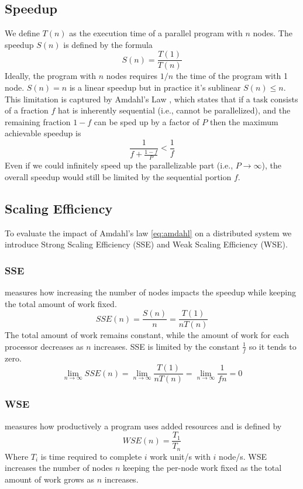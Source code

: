 \documentclass[conference]{IEEEtran}
\begin{document}
\subsection{Speedup}
We define $T(n)$ as the execution time of a parallel program with $n$ nodes. The speedup $S(n)$ is defined by the formula
\begin{equation}
S(n)= \frac{T(1)}{T(n)}
\end{equation}
Ideally, the program with $n$ nodes requires $1/n$ the time of the program with 1 node. $S(n) = n$ is a linear speedup but in practice it's sublinear $S(n) \leq n$. This limitation is captured by Amdahl's Law \cite{10.1145/1465482.1465560}, which states that if a task consists of a fraction $f$ hat is inherently sequential (i.e., cannot be parallelized), and the remaining fraction $1-f$ can be sped up by a factor of $P$ then the maximum achievable speedup is
\begin{equation}
\frac{1}{f + \frac{1-f}{P}}\label{eq:amdahl} < \frac{1}{f}
\end{equation}
Even if we could infinitely speed up the parallelizable part (i.e., $P \rightarrow \infty$), the overall speedup would still be limited by the sequential portion $f$.

\subsection{Scaling Efficiency}
To evaluate the impact of Amdahl's law \eqref{eq:amdahl} on a distributed system we introduce Strong Scaling Efficiency (SSE) and Weak Scaling Efficiency (WSE).

\subsubsection{SSE} measures how increasing the number of nodes impacts the speedup while keeping the total amount of work fixed.
\begin{equation}
    SSE(n) = \frac{S(n)}{n} = \frac{T(1)}{n T(n)}
\end{equation}
The total amount of work remains constant, while the amount of work for each processor decreases as $n$ increases. SSE is limited by the constant $\frac{1}{f}$ so it tends to zero.
\begin{equation}
    \lim_{n\to\infty} SSE(n) = \lim_{n\to\infty} \frac{T(1)}{n T(n)} = \lim_{n\to\infty} \frac{1}{fn} = 0
\end{equation}

\subsubsection{WSE} measures how productively a program uses added resources and is defined by
\begin{equation}
    WSE(n) = \frac{T_1}{T_n}
\end{equation}
Where $T_i$ is time required to complete $i$ work unit/s with $i$ node/s. WSE increases the number of nodes $n$ keeping the per-node work fixed as the total amount of work grows as $n$ increases.
\end{document}
